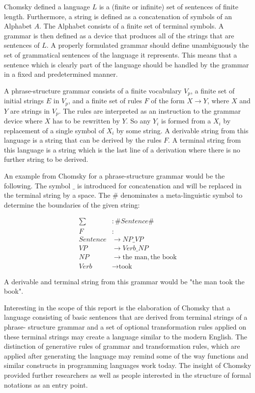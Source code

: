 \documentclass{article}
\begin{document}
Chomsky defined a language $L$ is a (finite or infinite) set of sentences of finite length. Furthermore, a string is defined as a concatenation of symbols of an Alphabet $A$. The Alphabet consists of a finite set of terminal symbols. A grammar is then defined as a device that produces all of the strings that are sentences of $L$. A properly formulated grammar should define unambiguously the set of grammatical sentences of the language it represents. This means that a sentence which is clearly part of the language should be handled by the grammar in a fixed and predetermined manner.

A phrase-structure grammar consists of a finite vocabulary $V_p$, a finite set of initial strings $E$ in $V_p$, and a finite set of rules $F$ of the form $X \to Y$, where $X$ and $Y$ are strings in $V_p$. The rules are interpreted as an instruction to the grammar device where $X$ has to be rewritten by $Y$. So any $Y_i$ is formed from a $X_i$ by replacement of a single symbol of $X_i$ by some string. A derivable string from this language is a string that can be derived by the rules $F$. A terminal string from this language is a string which is the last line of a derivation where there is no further string to be derived.

An example from Chomsky for a phrase-structure grammar would be the following. The symbol $\_$ is introduced for concatenation and will be replaced in the terminal string by a space. The \# denominates a meta-linguistic symbol to determine the boundaries of the given string:

\begin{equation} \label{eq1}
	\begin{split}
		\sum &: \# Sentence \# \\
		F&: \\ Sentence &\to NP\_VP \\
		VP &\to Verb\_NP \\
		NP &\to \text{the man}, \text{the book} \\
		Verb &\to \text{took}
	\end{split}
\end{equation}

A derivable and terminal string from this grammar would be "the man took the book".

Interesting in the scope of this report is the elaboration of Chomsky that a language consisting of basic sentences that are derived from terminal strings of a phrase- structure grammar and a set of optional transformation rules applied on these terminal strings may create a language similar to the modern English. The distinction of generative rules of grammar and transformation rules, which are applied after generating the language may remind some of the way functions and similar constructs in programming languages work today. The insight of Chomsky provided further researchers as well as people interested in the structure of formal notations as an entry point.
\end{document}
